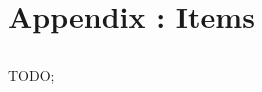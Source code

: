 \chapter{Appendix \thechapter{}: Items}
\label{chap:items}

\section{\lootExample{}}

TODO; \lipsum[1][1-5]

